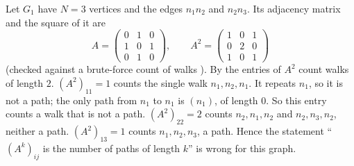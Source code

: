 \begin{example}\label{ex:board}
Let $G_1$ have $N = 3$ vertices and the edges $n_1n_2$ and $n_2n_3$. Its adjacency matrix and the square of it are
\[
A = \begin{pmatrix} 0&1&0\\ 1&0&1\\ 0&1&0 \end{pmatrix}, \qquad
A^2 = \begin{pmatrix} 1&0&1\\ 0&2&0\\ 1&0&1 \end{pmatrix}
\]
(checked against a brute-force count of walks \cite{m1_walks_script}). By  the entries of $A^2$ count walks of length $2$.
$(A^2)_{11} = 1$ counts the single walk $n_1, n_2, n_1$. It repeats $n_1$, so it is not a path; the only path from $n_1$ to $n_1$ is $(n_1)$, of length $0$. So this entry counts a walk that is not a path.
$(A^2)_{22} = 2$ counts $n_2, n_1, n_2$ and $n_2, n_3, n_2$, neither a path.
$(A^2)_{13} = 1$ counts $n_1, n_2, n_3$, a path.
Hence the statement ``$(A^k)_{ij}$ is the number of paths of length $k$'' is wrong for this graph.
\end{example}
